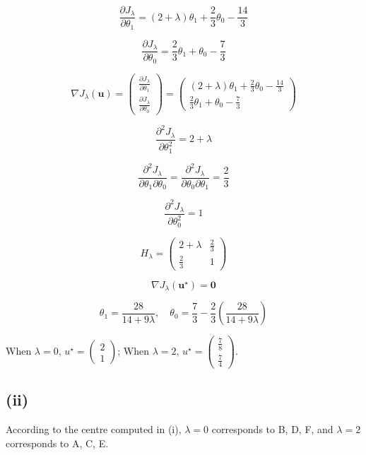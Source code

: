 \documentclass[11pt]{article}
\begin{document}
$$
\frac{\partial J_\lambda}{\partial \theta_1} = (2 + \lambda)\theta_1 + \frac{2}{3}\theta_0 - \frac{14}{3}
$$

$$
\frac{\partial J_\lambda}{\partial \theta_0} = \frac{2}{3}\theta_1 + \theta_0 - \frac{7}{3}
$$

$$
\nabla J_\lambda(\mathbf{u})
=
\begin{pmatrix}
    \frac{\partial J_\lambda}{\partial \theta_1} \\
    \frac{\partial J_\lambda}{\partial \theta_0}
\end{pmatrix}
=
\begin{pmatrix}
    (2 + \lambda)\theta_1 + \frac{2}{3}\theta_0 - \frac{14}{3} \\
    \frac{2}{3}\theta_1 + \theta_0 - \frac{7}{3}
\end{pmatrix}
$$

$$
\frac{\partial^2 J_\lambda}{\partial \theta_1^2} = 2 + \lambda
$$

$$
\frac{\partial^2 J_\lambda}{\partial \theta_1 \partial \theta_0}
= \frac{\partial^2 J_\lambda}{\partial \theta_0 \partial \theta_1}
= \frac{2}{3}
$$

$$
\frac{\partial^2 J_\lambda}{\partial \theta_0^2} = 1
$$

$$
H_\lambda
=
\begin{pmatrix} 
    2 + \lambda & \frac{2}{3} \\
    \frac{2}{3} & 1
\end{pmatrix}
$$

$$
\nabla J_\lambda(\mathbf{u}^\star) = \mathbf{0}
$$

$$
\theta_1 = \frac{28}{14 + 9\lambda}
,\quad
\theta_0 = \frac{7}{3} - \frac{2}{3}\left(\frac{28}{14 + 9\lambda}\right)
$$

When $\lambda = 0$, $
u^\star
=
\begin{pmatrix}
    2 \\
    1
\end{pmatrix}
$;
When $\lambda = 2$, $u^\star
=
\begin{pmatrix} 
    \frac{7}{8} \\
    \frac{7}{4}
\end{pmatrix}$.

\subsection*{(ii)}

According to the centre computed in (i), $\lambda = 0$ corresponds to B, D, F, and $\lambda = 2$ corresponds to A, C, E.
\end{document}
